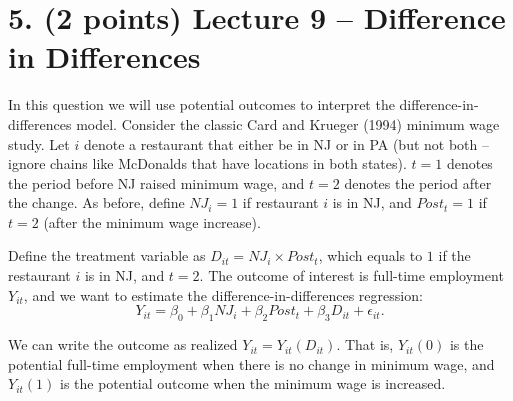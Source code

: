 \documentclass[12pt]{article}
\begin{document}
\newpage

\newpage
\section*{5. (2 points) Lecture 9 -- Difference in Differences}
In this question we will use potential outcomes to interpret the difference-in-differences model. Consider the classic Card and Krueger (1994) minimum wage study. Let $i$ denote a restaurant that either be in NJ or in PA (but not both -- ignore chains like McDonalds that have locations in both states). $t=1$ denotes the period before NJ raised minimum wage, and $t=2$ denotes the period after the change. As before, define $NJ_i=1$ if restaurant $i$ is in NJ, and $Post_t=1$ if $t=2$ (after the minimum wage increase).

Define the treatment variable as $D_{it}=NJ_i \times Post_t$, which equals to $1$ if the restaurant $i$ is in NJ, and $t=2$. The outcome of interest is full-time employment $Y_{it}$, and we want to estimate the difference-in-differences regression:
\[
  Y_{it}=\beta_0+\beta_1 NJ_i+\beta_2 Post_t+\beta_3 D_{it}+\epsilon_{it}.
\]

We can write the outcome as realized $Y_{it}=Y_{it}(D_{it})$. That is, $Y_{it}(0)$ is the potential full-time employment when there is no change in minimum wage, and $Y_{it}(1)$ is the potential outcome when the minimum wage is increased.
\end{document}
